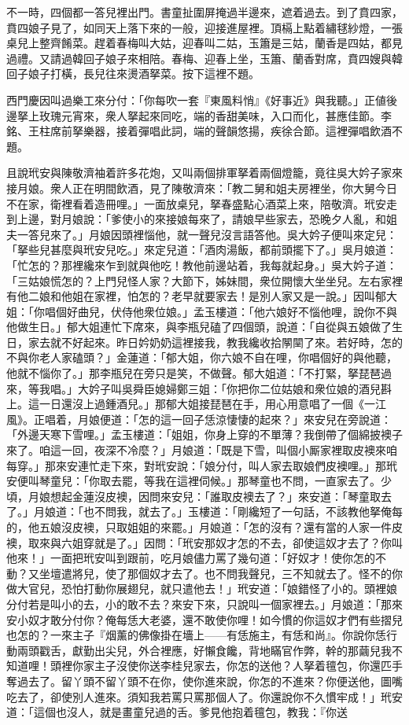不一時，四個都一答兒裡出門。書童扯圍屏掩過半邊來，遮着過去。到了賁四家，賁四娘子見了，如同天上落下來的一般，迎接進屋裡。頂槅上點着繡毬紗燈，一張桌兒上整齊餚菜。趕着春梅叫大姑，迎春叫二姑，玉簫是三姑，蘭香是四姑，都見過禮。又請過韓回子娘子來相陪。春梅、迎春上坐，玉簫、蘭香對席，賁四嫂與韓回子娘子打橫，長兒往來燙酒拏菜。按下這裡不題。

西門慶因叫過樂工來分付：「你每吹一套『東風料悄』《好事近》與我聽。」正値後邊拏上玫瑰元宵來，衆人拏起來同吃，端的香甜美味，入口而化，甚應佳節。李銘、王柱席前拏樂器，接着彈唱此詞，端的聲韻悠揚，疾徐合節。這裡彈唱飲酒不題。

且說玳安與陳敬濟袖着許多花炮，又叫兩個排軍拏着兩個燈籠，竟往吳大妗子家來接月娘。衆人正在明間飲酒，見了陳敬濟來：「教二舅和姐夫房裡坐，你大舅今日不在家，衛裡看着造冊哩。」一面放桌兒，拏春盛點心酒菜上來，陪敬濟。玳安走到上邊，對月娘說：「爹使小的來接娘每來了，請娘早些家去，恐晚夕人亂，和姐夫一答兒來了。」月娘因頭裡惱他，就一聲兒沒言語答他。吳大妗子便叫來定兒：「拏些兒甚麼與玳安兒吃。」來定兒道：「酒肉湯飯，都前頭擺下了。」吳月娘道：「忙怎的？那裡纔來乍到就與他吃！教他前邊站着，我每就起身。」吳大妗子道：「三姑娘慌怎的？上門兒怪人家？大節下，姊妹間，衆位開懷大坐坐兒。左右家裡有他二娘和他姐在家裡，怕怎的？老早就要家去！是別人家又是一說。」因叫郁大姐：「你唱個好曲兒，伏侍他衆位娘。」孟玉樓道：「他六娘好不惱他哩，說你不與他做生日。」郁大姐連忙下席來，與李瓶兒磕了四個頭，說道：「自從與五娘做了生日，家去就不好起來。昨日妗奶奶這裡接我，教我纔收拾䦛䦟了來。若好時，怎的不與你老人家磕頭？」金蓮道：「郁大姐，你六娘不自在哩，你唱個好的與他聽，他就不惱你了。」那李瓶兒在旁只是笑，不做聲。{}郁大姐道：「不打緊，拏琵琶過來，等我唱。」大妗子叫吳舜臣媳婦鄭三姐：「你把你二位姑娘和衆位娘的酒兒斟上。這一日還沒上過鍾酒兒。」那郁大姐接琵琶在手，用心用意唱了一個《一江風》。正唱着，月娘便道：「怎的這一回子恁涼悽悽的起來？」來安兒在旁說道：「外邊天寒下雪哩。」孟玉樓道：「姐姐，你身上穿的不單薄？我倒帶了個綿披襖子來了。咱這一回，夜深不冷麼？」月娘道：「既是下雪，叫個小厮家裡取皮襖來咱每穿。」那來安連忙走下來，對玳安說：「娘分付，叫人家去取娘們皮襖哩。」那玳安便叫琴童兒：「你取去罷，等我在這裡伺候。」那琴童也不問，一直家去了。少頃，月娘想起金蓮沒皮襖，因問來安兒：「誰取皮襖去了？」來安道：「琴童取去了。」月娘道：「也不問我，就去了。」玉樓道：「剛纔短了一句話，不該教他拏俺每的，他五娘沒皮襖，只取姐姐的來罷。」月娘道：「怎的沒有？還有當的人家一件皮襖，取來與六姐穿就是了。」因問：「玳安那奴才怎的不去，卻使這奴才去了？你叫他來！」一面把玳安叫到跟前，吃月娘儘力罵了幾句道：「好奴才！使你怎的不動？又坐壇遣將兒，使了那個奴才去了。也不問我聲兒，三不知就去了。怪不的你做大官兒，恐怕打動你展翅兒，就只遣他去！」玳安道：「娘錯怪了小的。頭裡娘分付若是叫小的去，小的敢不去？來安下來，只說叫一個家裡去。」月娘道：「那來安小奴才敢分付你？俺每恁大老婆，還不敢使你哩！如今慣的你這奴才們有些摺兒也怎的？一來主子『烟薰的佛像掛在墻上——有恁施主，有恁和尚』。你說你恁行動兩頭戳舌，獻勤出尖兒，外合裡應，好懶食饞，背地瞞官作弊，幹的那繭兒我不知道哩！頭裡你家主子沒使你送李桂兒家去，你怎的送他？人拏着氊包，你還匹手奪過去了。留丫頭不留丫頭不在你，使你進來說，你怎的不進來？你便送他，圖嘴吃去了，卻使別人進來。須知我若罵只罵那個人了。你還說你不久慣牢成！」玳安道：「這個也沒人，就是畫童兒過的舌。爹見他抱着氊包，教我：『你送